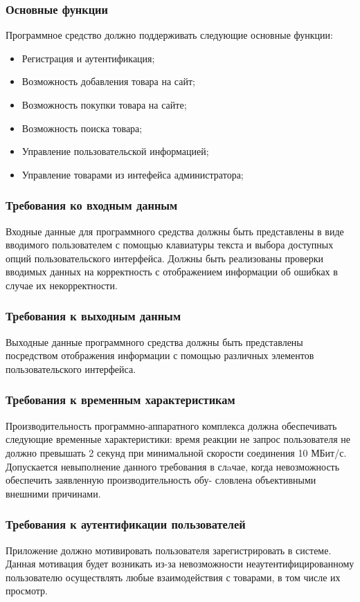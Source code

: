 \subsubsection{Основные функции}
Программное средство должно поддерживать следующие основные функции:
\begin{itemize}
  \item Регистрация и аутентификация;
  \item Возможность добавления товара на сайт;
  \item Возможность покупки товара на сайте;
  \item Возможность поиска товара;
  \item Управление пользовательской информацией;
  \item Управление товарами из интефейса администратора;
\end{itemize}

\subsubsection{Требования ко входным данным}
Входные данные для программного средства должны быть представлены в виде вводимого пользователем с помощью клавиатуры текста и выбора доступных опций пользовательского интерфейса.
Должны быть реализованы проверки вводимых данных на корректность с отображением информации об ошибках в случае их некорректности.

\subsubsection{Требования к выходным данным}
Выходные данные программного средства должны быть представлены посредством отображения информации с помощью различных элементов пользовательского интерфейса.

\subsubsection{Требования к временным характеристикам}
Производительность программно-аппаратного комплекса должна обеспечивать следующие временные характеристики: время реакции не запрос пользователя не должно превышать 2 секунд при минимальной скорости соединения 10 МБит/с.
Допускается невыполнение данного требования в слaчае, когда невозможность обеспечить заявленную производительность обу- словлена объективными внешними причинами.

\subsubsection{Требования к аутентификации пользователей}
Приложение должно мотивировать пользователя зарегистрировать в системе.
Данная мотивация будет возникать из-за невозможности неаутентифицированному пользователю осуществлять любые взаимодействия с товарами, в том числе их просмотр.

